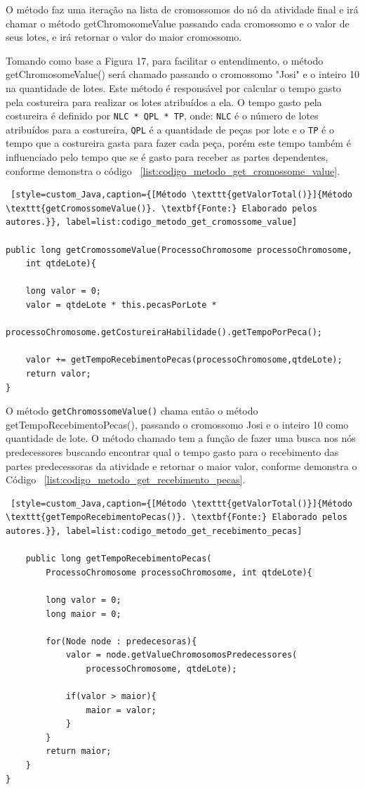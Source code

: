 \par O método faz uma iteração na lista de cromossomos do nó da atividade final e irá chamar o método getChromosomeValue passando 
cada cromossomo e o valor de seus lotes, e irá retornar o valor do maior cromossomo.

\par Tomando como base a Figura 17, para facilitar o entendimento, o método
getChromosomeValue() será chamado passando o cromossomo "Josi" e o inteiro 10 na quantidade de lotes. 
Este método é responsável por calcular o tempo gasto 
pela costureira para realizar os lotes atribuídos a ela. O tempo gasto pela
costureira é definido por \texttt{NLC * QPL * TP}, onde: \texttt{NLC} é o número
de lotes atribuídos para a costureira, \texttt{QPL} é a quantidade de peças por
lote e o \texttt{TP} é o tempo que a costureira gasta para fazer cada peça, 
porém este tempo também é influenciado pelo tempo que se é gasto para receber 
as partes dependentes, conforme demonstra o código ~\ref{list:codigo_metodo_get_cromossome_value}.


\begin{lstlisting} [style=custom_Java,caption={[Método \texttt{getValorTotal()}]{Método \texttt{getCromossomeValue()}. \textbf{Fonte:} Elaborado pelos autores.}}, label=list:codigo_metodo_get_cromossome_value] 	

public long getCromossomeValue(ProcessoChromosome processoChromosome,
	int qtdeLote){
	
	long valor = 0;
	valor = qtdeLote * this.pecasPorLote *
		 processoChromosome.getCostureiraHabilidade().getTempoPorPeca();

	valor += getTempoRecebimentoPecas(processoChromosome,qtdeLote);
	return valor;
}

\end{lstlisting}

\par O método \texttt{getChromossomeValue()} chama então o método getTempoRecebimentoPecas(), passando o cromossomo Josi e 
o inteiro 10 como quantidade de lote. O método chamado tem a função de fazer uma busca nos nós predecessores buscando encontrar 
qual o tempo gasto para o recebimento das partes predecessoras da atividade e retornar o maior valor, 
conforme demonstra o Código ~\ref{list:codigo_metodo_get_recebimento_pecas}.

\begin{lstlisting} [style=custom_Java,caption={[Método \texttt{getValorTotal()}]{Método \texttt{getTempoRecebimentoPecas()}. \textbf{Fonte:} Elaborado pelos autores.}}, label=list:codigo_metodo_get_recebimento_pecas] 	

	public long getTempoRecebimentoPecas(
		ProcessoChromosome processoChromosome, int qtdeLote){
		
		long valor = 0;
		long maior = 0;
		
		for(Node node : predecesoras){
			valor = node.getValueChromosomosPredecessores(
				processoChromosome, qtdeLote);
			
			if(valor > maior){
				maior = valor;
			}
		}
		return maior;
	}
}

\end{lstlisting}


